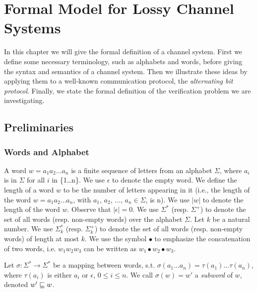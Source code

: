 \section{Formal Model for Lossy Channel Systems}
\label{definitions}
In this chapter we will give the formal definition of a channel system. First we define some necessary terminology, such as alphabets and words, before giving the syntax and semantics of a channel system. Then we illustrate these ideas by applying them to a well-known communication protocol, the \emph{alternating bit protocol}. Finally, we state the formal definition of the verification problem we are investigating.

\subsection{Preliminaries}
\subsubsection{Words and Alphabet}
\label{words}
A word  $w = a_1a_2\ldots a_n$ is a finite sequence of letters from an alphabet $\Sigma$, where $a_i$ is in $\Sigma$ for all $i$ in \{1\ldots n\}. We use $\epsilon$  to denote the empty word. We define the length  of a word $w$ to be the number of letters appearing in it (i.e., the length of the word $w=a_1 a_2 \ldots a_n$, with $a_1$, $a_2$, $\ldots$, $a_n \in \Sigma$, is n). We use $|w|$ to denote the length of the word $w$. Observe that $|\epsilon|=0$. We use $\Sigma^*$  (resp. $\Sigma^+$) to denote the set of all  words (resp. non-empty words) over the alphabet $\Sigma$.  Let $k$ be a natural number.  We use $\Sigma_k^*$  (resp. $\Sigma_k^+$) to denote the set of all  words (resp. non-empty words)  of length at most $k$. We use the symbol $\bullet$ to emphasize the concatenation of two words, i.e. $w_1w_2w_3$ can be written as $w_1 \bullet w_2 \bullet w_3$.


Let $\sigma : \Sigma^* \rightarrow \Sigma^*$ be a mapping between words, s.t. $\sigma(a_1\ldots a_n) = \tau(a_1)\ldots \tau(a_n)$, where $\tau(a_i)$ is either $a_i$ or $\epsilon$, $0 \leq i \leq n$. We call $\sigma(w) = w'$ a \emph{subword} of $w$, denoted $w' \sqsubseteq w$.

